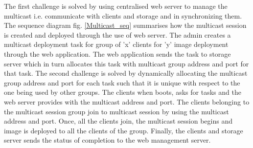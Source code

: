 \documentclass[a4paper,12pt]{article}
\begin{document}
The first challenge is solved by using centralised web server to manage the multicast i.e. communicate with clients and storage and in synchronizing them. The sequence diagram fig. \ref{Multicast_seq} summarises how the multicast session is created and deployed through the use of web server. The admin creates a multicast deployment task for group of 'x' clients for 'y' image deployment through the web application. The web application sends the task to storage server which in turn allocates this task with multicast group address and port for that task. The second challenge is solved by dynamically allocating the multicast group address and port for each task such that it is unique with respect to the one being used by other groups. The clients when boots, asks for tasks and the web server provides with the multicast address and port. The clients belonging to the multicast session group join to multicast session by using the multicast address and port. Once, all the clients join, the multicast session begins and image is deployed to all the clients of the group. Finally, the clients and storage server sends the status of completion to the web management server.

\end{document}
